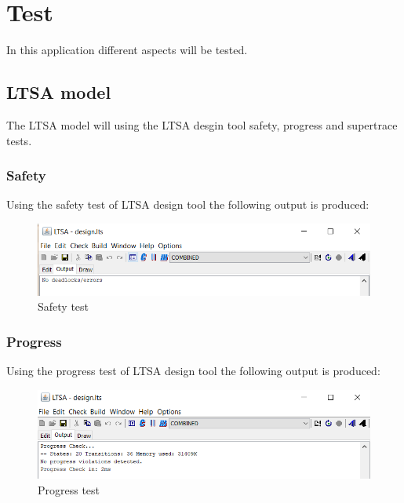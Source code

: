 \hypertarget{test}{%
\chapter{Test}\label{test}}

In this application different aspects will be tested.

\hypertarget{ltsa-model}{%
\section{LTSA model}\label{ltsa-model}}

The LTSA model will using the LTSA desgin tool safety, progress and
supertrace tests.

\hypertarget{safety}{%
\subsection{Safety}\label{safety}}

Using the safety test of LTSA design tool the following output is
produced:

\begin{figure}
\centering
\includegraphics{../img/safety.png}
\caption{Safety test}
\end{figure}

\hypertarget{progress}{%
\subsection{Progress}\label{progress}}

Using the progress test of LTSA design tool the following output is
produced:

\begin{figure}
\centering
\includegraphics{../img/progress.png}
\caption{Progress test}
\end{figure}

